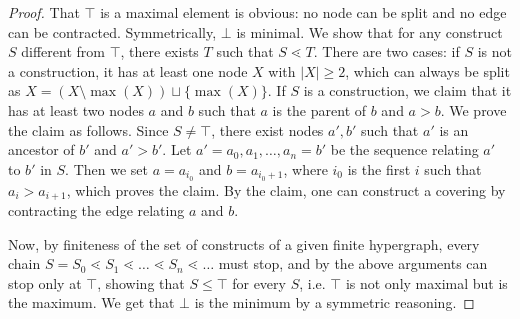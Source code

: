 \documentclass{article}
\theoremstyle{plain}
\theoremstyle{definition}
\newcommand{\set}[1]{\{#1\}}
\begin{document}
\begin{proof}
That $\top$ is a maximal element is obvious: no node can be split and no edge can be contracted. Symmetrically, $\bot$ is minimal. We show that for any construct $S$ different from $\top$, there exists
$T$ such that $S\lessdot T$. There are two cases: if $S$ is not a construction, it has at least one node $X$ with $|X|\geq 2$, which can always be split as $X=(X\setminus\max(X))\sqcup\set{\max(X)}$. If $S$ is a construction, we claim that it has at least two nodes $a$ and $b$ such that $a$ is the parent of $b$ and $a>b$. 
We prove the claim as follows. Since $S\neq\top$, there exist nodes $a',b'$ such that $a'$ is an ancestor of $b'$ and $a'>b'$. Let $a'=a_0,a_1,\ldots,a_n=b'$ be the sequence relating $a'$ to $b'$ in $S$. Then we set $a=a_{i_0}$ and $b=a_{i_0+1}$, where $i_0$ is the first $i$ such that $a_i>a_{i+1}$, which proves the claim.
By the claim, one can construct a covering by contracting the edge relating $a$ and $b$. 

Now, by finiteness of the set of constructs of a given finite hypergraph, every chain $S=S_0\lessdot S_1\lessdot\ldots\lessdot S_n\lessdot\ldots$ must stop, 
and by the above arguments can stop only at $\top$, showing that $S\leq\top$ for every $S$, i.e. $\top$ is not only maximal but is the maximum. We get that $\bot$ is the minimum by a symmetric reasoning.
\end{proof}
\end{document}
